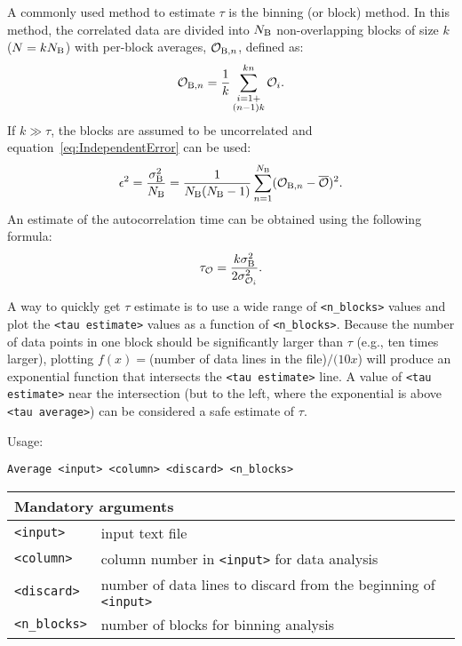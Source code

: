 A commonly used method to estimate $\tau$
is the binning (or block) method. In this method, the correlated data are
divided into $N_{\mathrm{B}}$ non-overlapping blocks of size $k$ ($N=k
N_{\mathrm{B}}$) with per-block averages, $\mathcal{O}_{\mathrm{B},n}$,
defined as:
\begin{equation} \label{eq:BlockAverage} %
  \mathcal{O}_{\mr{B},n} = \frac{1}{k}
    \sum^{k n}_{\substack{i=1+\\(n-1)k}} \mathcal{O}_i.
\end{equation} %
If $k\gg\tau$, the blocks are assumed to be uncorrelated and
equation~\eqref{eq:IndependentError} can be used:
\begin{equation} \label{eq:Error} %
  \epsilon^2 =
  \frac{\sigma^2_{\mr{B}} }{N_{\mr{B}} } = \frac{1}{N_{\mr{B}} (N_{\mr{B}}
  -1)} \sum^{N_{\mr{B}} }_{n=1} (\mathcal{O}_{\mr{B},n} -
  \overline{\mathcal{O}})^2.
\end{equation} %
An estimate of the autocorrelation time can be obtained using the following
formula:
\begin{equation} \label{eq:tau} %
  \tau_{\mathcal{O}} = \frac{k \sigma^2_{\mr{B}} }{2
  \sigma^2_{\mathcal{O}_i}}.
\end{equation} %

A way to quickly get $\tau$ estimate is to use a wide range of
\texttt{<n\_blocks>} values and plot the \texttt{<tau estimate>} values as
a function of \texttt{<n\_blocks>}. Because the number of data points in
one block should be significantly larger than
$\tau$ (e.g., ten times larger), plotting $f(x)=$(number of data lines in
the file)$/(10x$) will produce an exponential function that intersects the
\texttt{<tau estimate>} line. A value of \texttt{<tau estimate>} near the
intersection (but to the left, where the exponential is above \texttt{<tau
average>}) can be considered a safe estimate of $\tau$.

Usage:

\vspace{1em}
\noindent
\texttt{Average <input> <column> <discard> <n\_blocks>}

\noindent
\begin{longtable}{p{}p{}}
  \toprule
  \multicolumn{2}{l}{Mandatory arguments} \\
  \midrule
  \texttt{<input>} & input text file \\
  \texttt{<column>} & column number in \texttt{<input>} for data analysis \\
  \texttt{<discard>} & number of data lines to discard from the beginning of
    \texttt{<input>} \\
  \texttt{<n\_blocks>} & number of blocks for binning analysis \\
  \bottomrule
\end{longtable}

